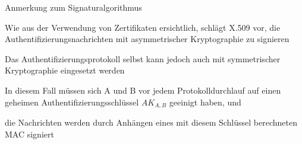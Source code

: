 \documentclass[a4paper]{article}
\begin{document}
\begin{multicols}{3}
\begin{itemize*}
\begin{itemize*}
            \end{itemize*}
            \item Anmerkung zum Signaturalgorithmus
            \begin{itemize*}
                  \item Wie aus der Verwendung von Zertifikaten ersichtlich, schlägt X.509 vor, die Authentifizierungsnachrichten mit asymmetrischer Kryptographie zu signieren
                  \item Das Authentifizierungsprotokoll selbst kann jedoch auch mit symmetrischer Kryptographie eingesetzt werden
                  \item In diesem Fall müssen sich A und B vor jedem Protokolldurchlauf auf einen geheimen Authentifizierungsschlüssel $AK_{A,B}$ geeinigt haben, und
                  \item die Nachrichten werden durch Anhängen eines mit diesem Schlüssel berechneten MAC signiert
            \end{itemize*}
      \end{itemize*}


\end{multicols}
\end{document}
